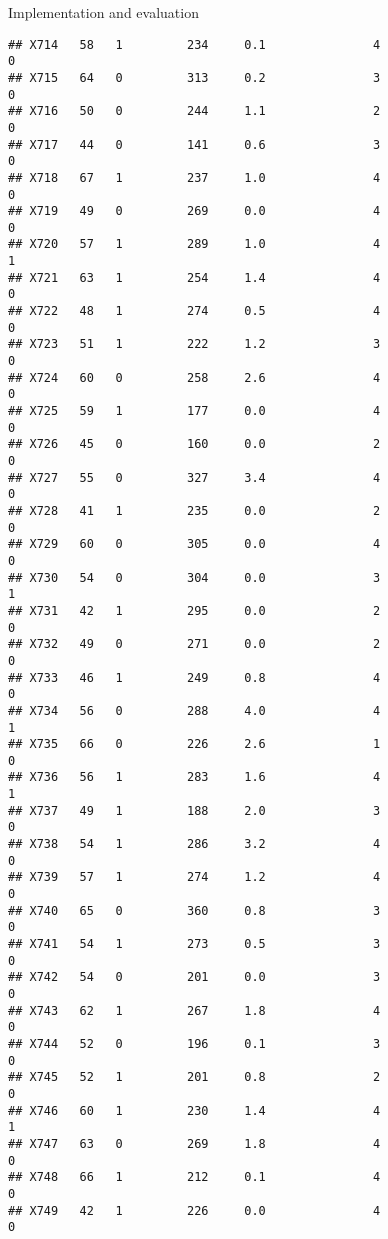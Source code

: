 \documentclass[
  ignorenonframetext,
]{beamer}
\begin{document}
\begin{frame}[fragile]{Implementation and evaluation}
\begin{verbatim}
## X714   58   1         234     0.1               4                   0
## X715   64   0         313     0.2               3                   0
## X716   50   0         244     1.1               2                   0
## X717   44   0         141     0.6               3                   0
## X718   67   1         237     1.0               4                   0
## X719   49   0         269     0.0               4                   0
## X720   57   1         289     1.0               4                   1
## X721   63   1         254     1.4               4                   0
## X722   48   1         274     0.5               4                   0
## X723   51   1         222     1.2               3                   0
## X724   60   0         258     2.6               4                   0
## X725   59   1         177     0.0               4                   0
## X726   45   0         160     0.0               2                   0
## X727   55   0         327     3.4               4                   0
## X728   41   1         235     0.0               2                   0
## X729   60   0         305     0.0               4                   0
## X730   54   0         304     0.0               3                   1
## X731   42   1         295     0.0               2                   0
## X732   49   0         271     0.0               2                   0
## X733   46   1         249     0.8               4                   0
## X734   56   0         288     4.0               4                   1
## X735   66   0         226     2.6               1                   0
## X736   56   1         283     1.6               4                   1
## X737   49   1         188     2.0               3                   0
## X738   54   1         286     3.2               4                   0
## X739   57   1         274     1.2               4                   0
## X740   65   0         360     0.8               3                   0
## X741   54   1         273     0.5               3                   0
## X742   54   0         201     0.0               3                   0
## X743   62   1         267     1.8               4                   0
## X744   52   0         196     0.1               3                   0
## X745   52   1         201     0.8               2                   0
## X746   60   1         230     1.4               4                   1
## X747   63   0         269     1.8               4                   0
## X748   66   1         212     0.1               4                   0
## X749   42   1         226     0.0               4                   0

\end{verbatim}
\end{frame}
\end{document}
